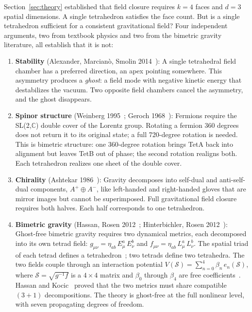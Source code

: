 \documentclass[aps,prd,preprint,superscriptaddress,showpacs,preprintnumbers,amsmath,amssymb,nofootinbib]{revtex4-2}
\begin{document}
Section~\ref{sec:theory} established that field closure requires $k = 4$ faces and $d = 3$ spatial dimensions. A single tetrahedron satisfies the face count. But is a single tetrahedron sufficient for a consistent gravitational field? Four independent arguments, two from textbook physics and two from the bimetric gravity literature, all establish that it is not:

\begin{enumerate}
\item \textbf{Stability} (Alexander, Marcian\`o, Smolin 2014~\cite{alexander2014}): A single tetrahedral field chamber has a preferred direction, an apex pointing somewhere. This asymmetry produces a \emph{ghost}: a field mode with negative kinetic energy that destabilizes the vacuum. Two opposite field chambers cancel the asymmetry, and the ghost disappears.

\item \textbf{Spinor structure} (Weinberg 1995~\cite{weinberg1995}; Geroch 1968~\cite{geroch1968}): Fermions require the SL(2,$\mathbb{C}$) double cover of the Lorentz group. Rotating a fermion 360 degrees does not return it to its original state; a full 720-degree rotation is needed. This is bimetric structure: one 360-degree rotation brings TetA back into alignment but leaves TetB out of phase; the second rotation realigns both. Each tetrahedron realizes one sheet of the double cover.

\item \textbf{Chirality} (Ashtekar 1986~\cite{ashtekar1986}): Gravity decomposes into self-dual and anti-self-dual components, $A^+ \oplus A^-$, like left-handed and right-handed gloves that are mirror images but cannot be superimposed. Full gravitational field closure requires both halves. Each half corresponds to one tetrahedron.

\item \textbf{Bimetric gravity} (Hassan, Rosen 2012~\cite{hassan2012}; Hinterbichler, Rosen 2012~\cite{hinterbichler2012}): Ghost-free bimetric gravity requires two dynamical metrics, each decomposed into its own tetrad field: $g_{\mu\nu} = \eta_{ab}\,E^a_\mu\,E^b_\nu$ and $f_{\mu\nu} = \eta_{ab}\,L^a_\mu\,L^b_\nu$. The spatial triad of each tetrad defines a tetrahedron~\cite{barbieri1998}; two tetrads define two tetrahedra. The two fields couple through an interaction potential $V(\mathcal{S}) = \sum_{n=0}^{4} \beta_n\,e_n(\mathcal{S})$, where $\mathcal{S} = \sqrt{g^{-1}f}$ is a $4 \times 4$ matrix and $\beta_0$ through $\beta_4$ are free coefficients~\cite{hassan2012}. Hassan and Kocic~\cite{hassankocic2018} proved that the two metrics must share compatible $(3{+}1)$ decompositions. The theory is ghost-free at the full nonlinear level, with seven propagating degrees of freedom.
\end{enumerate}
\end{document}
